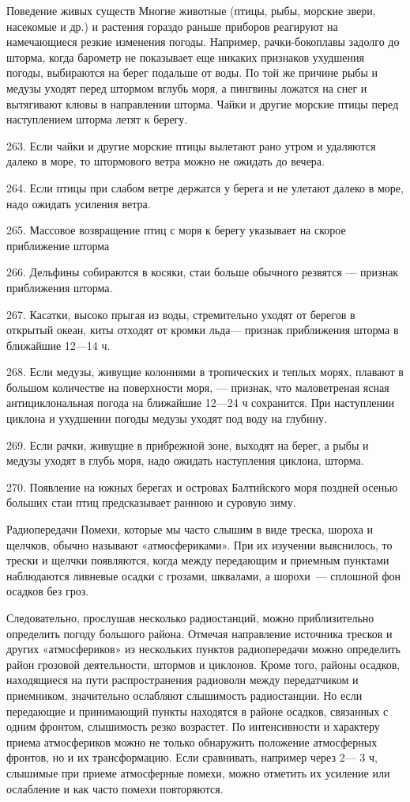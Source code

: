 Поведение живых существ
Многие животные (птицы, рыбы, морские звери, насекомые и др.) и растения гораздо раньше приборов реагируют на намечающиеся резкие изменения погоды. Например, рачки-бокоплавы задолго до шторма, когда барометр не показывает еще никаких признаков ухудшения погоды, выбираются на берег подальше от воды. По той же причине рыбы и медузы уходят перед штормом вглубь моря, а пингвины ложатся на снег и вытягивают клювы в направлении шторма. Чайки и другие морские птицы перед наступлением шторма летят к берегу.

263. Если чайки и другие морские птицы вылетают рано утром и удаляются далеко в море, то штормового ветра можно не ожидать до вечера.

264. Если птицы при слабом ветре держатся у берега и не улетают далеко в море, надо ожидать усиления ветра.

265. Массовое возвращение птиц с моря к берегу указывает на скорое приближение шторма

266. Дельфины собираются в косяки, стаи больше обычного резвятся — признак приближения шторма.

267. Касатки, высоко прыгая из воды, стремительно уходят от берегов в открытый океан, киты отходят от кромки льда— признак приближения шторма в ближайшие 12—14 ч.

268. Если медузы, живущие колониями в тропических и теплых морях, плавают в большом количестве на поверхности моря, — признак, что маловетреная ясная антициклональная погода на ближайшие 12—24 ч сохранится. При наступлении циклона и ухудшении погоды медузы уходят под воду на глубину.

269. Если рачки, живущие в прибрежной зоне, выходят на берег, а рыбы и медузы уходят в глубь моря, надо ожидать наступления циклона, шторма.

270. Появление на южных берегах и островах Балтийского моря поздней осенью больших стаи птиц предсказывает раннюю и суровую зиму.

Радиопередачи
Помехи, которые мы часто слышим в виде треска, шороха и щелчков, обычно называют «атмосфериками». При их изучении выяснилось, то трески и щелчки появляются, когда между передающим и приемным пунктами наблюдаются ливневые осадки с грозами, шквалами, а шорохи~--- сплошной фон осадков без гроз.

Следовательно, прослушав несколько радиостанций, можно приблизительно определить погоду большого района. Отмечая направление источника тресков и других «атмосфериков» из нескольких пунктов радиопередачи можно определить район грозовой деятельности, штормов и циклонов. Кроме того, районы осадков, находящиеся на пути распространения радиоволн между передатчиком и приемником, значительно ослабляют слышимость радиостанции. Но если передающие и принимающий пункты находятся в районе осадков, связанных с одним фронтом, слышимость резко возрастет. По интенсивности и характеру приема атмосфериков можно не только обнаружить положение атмосферных фронтов, но и их трансформацию. Если сравнивать, например через 2— 3 ч, слышимые при приеме атмосферные помехи, можно отметить их усиление или ослабление и как часто помехи повторяются.

